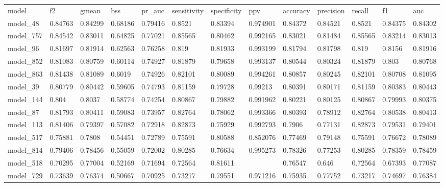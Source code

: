 \begin{tabular}{lllllllllllll}
model      & f2      & gmean   & bss     & pr\_auc & sensitivity & specificity & ppv      & accuracy & precision & recall  & f1      & auc     \\
model\_48  & 0.84763 & 0.84299 & 0.68186 & 0.79416 & 0.8521      & 0.83394     & 0.974901 & 0.84372  & 0.84521   & 0.8521  & 0.84375 & 0.84302 \\
model\_757 & 0.84542 & 0.83011 & 0.64825 & 0.77021 & 0.85565     & 0.80462     & 0.992165 & 0.83021  & 0.81484   & 0.85565 & 0.83214 & 0.83013 \\
model\_96  & 0.81697 & 0.81914 & 0.62563 & 0.76258 & 0.819       & 0.81933     & 0.993199 & 0.81794  & 0.81798   & 0.819   & 0.8156  & 0.81916 \\
model\_852 & 0.81083 & 0.80759 & 0.60114 & 0.74927 & 0.81879     & 0.79658     & 0.993137 & 0.80544  & 0.80324   & 0.81879 & 0.803   & 0.80768 \\
model\_863 & 0.81438 & 0.81089 & 0.6019  & 0.74926 & 0.82101     & 0.80089     & 0.994261 & 0.80857  & 0.80245   & 0.82101 & 0.80708 & 0.81095 \\
model\_39  & 0.80779 & 0.80442 & 0.59605 & 0.74793 & 0.81159     & 0.79728     & 0.99213  & 0.80391  & 0.80171   & 0.81159 & 0.80383 & 0.80443 \\
model\_144 & 0.804   & 0.8037  & 0.58774 & 0.74254 & 0.80867     & 0.79882     & 0.991962 & 0.80221  & 0.80125   & 0.80867 & 0.79993 & 0.80375 \\
model\_87  & 0.81793 & 0.80411 & 0.59083 & 0.73957 & 0.82764     & 0.78062     & 0.993366 & 0.80393  & 0.78912   & 0.82764 & 0.80538 & 0.80413 \\
model\_113 & 0.81406 & 0.79397 & 0.57082 & 0.72918 & 0.82873     & 0.75929     & 0.992793 & 0.7906   & 0.77131   & 0.82873 & 0.79531 & 0.79401 \\
model\_517 & 0.75881 & 0.7808  & 0.54451 & 0.72789 & 0.75591     & 0.80588     & 0.852076 & 0.77469  & 0.79148   & 0.75591 & 0.76672 & 0.78089 \\
model\_814 & 0.79406 & 0.78456 & 0.55059 & 0.72002 & 0.80285     & 0.76634     & 0.995273 & 0.78326  & 0.77253   & 0.80285 & 0.78359 & 0.78459 \\
model\_518 & 0.70295 & 0.77004 & 0.52169 & 0.71694 & 0.72564     & 0.81611     &          & 0.76547  & 0.646     & 0.72564 & 0.67393 & 0.77087 \\
model\_729 & 0.73639 & 0.76374 & 0.50667 & 0.70925 & 0.73217     & 0.79551     & 0.971216 & 0.75935  & 0.77752   & 0.73217 & 0.74697 & 0.76384 \\

\end{tabular}
